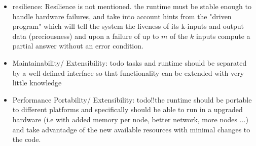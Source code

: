 \begin{itemize}
\item resilience: Resilience is not mentioned. the runtime must be stable enough to handle hardware failures, and take into account hints from the "driven program" which will tell the system the liveness of its k-inputs and output data (preciousness) and upon a failure of up to $m$ of the $k$ inputs compute a partial answer without an error condition.
\item Maintainability/ Extensibility: todo  tasks and runtime should be separated by a well defined interface so that functionality can be extended with very little knowledge 
\item Performance Portability/ Extensibility: todo!!the runtime should be portable to different platforms and specifically should be able to run in a upgraded hardware (i.e with added memory per node, better network, more nodes ...) and take advantadge of the new available resources with minimal changes to the code.
\end{itemize}
